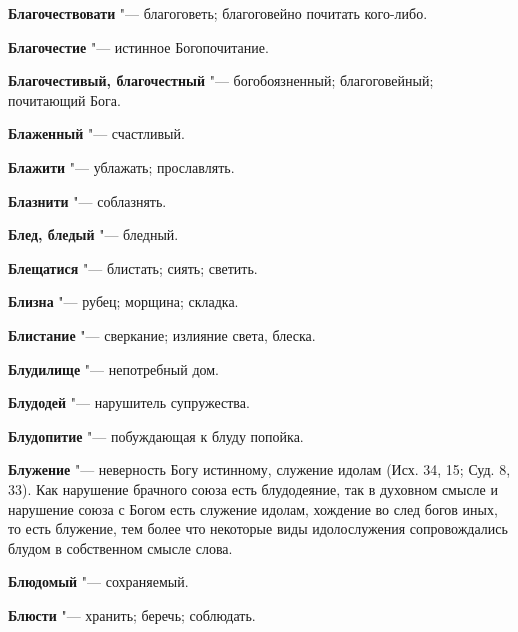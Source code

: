 \begin{mymulticols}{2}
\noindent\textbf{Благочествовати} "--- благоговеть; благоговейно почитать кого-либо. 




\noindent\textbf{Благочестие} "--- истинное Богопочитание. 




\noindent\textbf{Благочестивый, благочестный} "--- богобоязненный; благоговейный; почитающий Бога. 




\noindent\textbf{Блаженный} "--- счастливый. 




\noindent\textbf{Блажити} "--- ублажать; прославлять. 




\noindent\textbf{Блазнити} "--- соблазнять. 




\noindent\textbf{Блед, бледый} "--- бледный. 




\noindent\textbf{Блещатися} "--- блистать; сиять; светить. 




\noindent\textbf{Близна} "--- рубец; морщина; складка. 




\noindent\textbf{Блистание} "--- сверкание; излияние света, блеска. 




\noindent\textbf{Блудилище} "--- непотребный дом. 




\noindent\textbf{Блудодей} "--- нарушитель супружества. 




\noindent\textbf{Блудопитие} "--- побуждающая к блуду попойка. 




\noindent\textbf{Блужение} "--- неверность Богу истинному, служение идолам (Исх. 34, 15; Суд. 8, 33). Как нарушение брачного союза есть блудодеяние, так в духовном смысле и нарушение союза с Богом есть служение идолам, хождение во след богов иных, то есть блужение, тем более что некоторые виды идолослужения сопровождались блудом в собственном смысле слова. 




\noindent\textbf{Блюдомый} "--- сохраняемый. 




\noindent\textbf{Блюсти} "--- хранить; беречь; соблюдать. 





\end{mymulticols}
